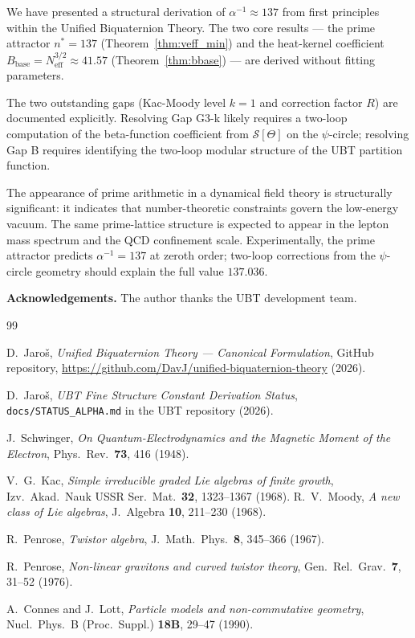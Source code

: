 \documentclass[11pt,a4paper]{article}
\theoremstyle{definition}
\theoremstyle{remark}
\begin{document}
We have presented a structural derivation of $\alpha^{-1} \approx 137$ from
first principles within the Unified Biquaternion Theory. The two core results —
the prime attractor $n^* = 137$ (Theorem~\ref{thm:veff_min}) and the heat-kernel
coefficient $B_{\mathrm{base}} = N_{\mathrm{eff}}^{3/2} \approx 41.57$
(Theorem~\ref{thm:bbase}) — are derived without fitting parameters.

The two outstanding gaps (Kac-Moody level $k = 1$ and correction factor $R$)
are documented explicitly. Resolving Gap G3-k likely requires a two-loop
computation of the beta-function coefficient from $\mathcal{S}[\Theta]$ on
the $\psi$-circle; resolving Gap B requires identifying the two-loop modular
structure of the UBT partition function.

The appearance of prime arithmetic in a dynamical field theory is structurally
significant: it indicates that number-theoretic constraints govern the low-energy
vacuum. The same prime-lattice structure is expected to appear in the lepton mass
spectrum and the QCD confinement scale. Experimentally, the prime attractor
predicts $\alpha^{-1} = 137$ at zeroth order; two-loop corrections from the
$\psi$-circle geometry should explain the full value $137.036$.

\bigskip
\noindent\textbf{Acknowledgements.} The author thanks the UBT development team.


\begin{thebibliography}{99}

D.\ Jaroš,
\textit{Unified Biquaternion Theory — Canonical Formulation},
GitHub repository, \url{https://github.com/DavJ/unified-biquaternion-theory}
(2026).

D.\ Jaroš,
\textit{UBT Fine Structure Constant Derivation Status},
\texttt{docs/STATUS\_ALPHA.md} in the UBT repository (2026).

J.\ Schwinger,
\textit{On Quantum-Electrodynamics and the Magnetic Moment of the Electron},
Phys.\ Rev.\ \textbf{73}, 416 (1948).

V.\ G.\ Kac,
\textit{Simple irreducible graded Lie algebras of finite growth},
Izv.\ Akad.\ Nauk USSR Ser.\ Mat.\ \textbf{32}, 1323--1367 (1968).
R.\ V.\ Moody,
\textit{A new class of Lie algebras},
J.\ Algebra \textbf{10}, 211--230 (1968).

R.\ Penrose,
\textit{Twistor algebra},
J.\ Math.\ Phys.\ \textbf{8}, 345--366 (1967).

R.\ Penrose,
\textit{Non-linear gravitons and curved twistor theory},
Gen.\ Rel.\ Grav.\ \textbf{7}, 31--52 (1976).

A.\ Connes and J.\ Lott,
\textit{Particle models and non-commutative geometry},
Nucl.\ Phys.\ B (Proc.\ Suppl.) \textbf{18B}, 29--47 (1990).

\end{thebibliography}
\end{document}
